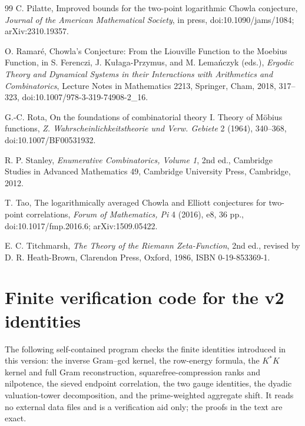 \documentclass[11pt]{amsart}
\numberwithin{equation}{section}
\theoremstyle{plain}
\theoremstyle{definition}
\theoremstyle{remark}
\begin{document}
\begin{thebibliography}{99}
C. Pilatte,
Improved bounds for the two-point logarithmic Chowla conjecture,
\emph{Journal of the American Mathematical Society}, in press,
doi:10.1090/jams/1084; arXiv:2310.19357.

O. Ramaré,
Chowla's Conjecture: From the Liouville Function to the Moebius Function,
in S. Ferenczi, J. Kułaga-Przymus, and M. Lemańczyk (eds.),
\emph{Ergodic Theory and Dynamical Systems in their Interactions with Arithmetics and Combinatorics},
Lecture Notes in Mathematics 2213, Springer, Cham, 2018, 317--323,
doi:10.1007/978-3-319-74908-2\_16.

G.-C. Rota,
On the foundations of combinatorial theory I. Theory of Möbius functions,
\emph{Z. Wahrscheinlichkeitstheorie und Verw. Gebiete} 2 (1964), 340--368,
doi:10.1007/BF00531932.

R. P. Stanley,
\emph{Enumerative Combinatorics, Volume 1},
2nd ed., Cambridge Studies in Advanced Mathematics 49,
Cambridge University Press, Cambridge, 2012.

T. Tao,
The logarithmically averaged Chowla and Elliott conjectures for two-point correlations,
\emph{Forum of Mathematics, Pi} 4 (2016), e8, 36 pp.,
doi:10.1017/fmp.2016.6; arXiv:1509.05422.

E. C. Titchmarsh,
\emph{The Theory of the Riemann Zeta-Function},
2nd ed., revised by D. R. Heath-Brown,
Clarendon Press, Oxford, 1986, ISBN 0-19-853369-1.

\end{thebibliography}

\appendix

\section{Finite verification code for the v2 identities}
\label{app:verification_code}

The following self-contained program checks the finite identities introduced in this version: the inverse Gram--gcd kernel, the row-energy formula, the $K^*K$ kernel and full Gram reconstruction, squarefree-compression ranks and nilpotence, the sieved endpoint correlation, the two gauge identities, the dyadic valuation-tower decomposition, and the prime-weighted aggregate shift.  It reads no external data files and is a verification aid only; the proofs in the text are exact.
\end{document}
